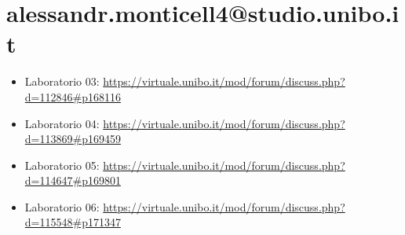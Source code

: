\section{alessandr.monticell4@studio.unibo.it}
\begin{itemize}
    \item Laboratorio 03: \url{https://virtuale.unibo.it/mod/forum/discuss.php?d=112846#p168116}
    \item Laboratorio 04: \url{https://virtuale.unibo.it/mod/forum/discuss.php?d=113869#p169459}
    \item Laboratorio 05: \url{https://virtuale.unibo.it/mod/forum/discuss.php?d=114647#p169801}
    \item Laboratorio 06: \url{https://virtuale.unibo.it/mod/forum/discuss.php?d=115548#p171347}
\end{itemize}